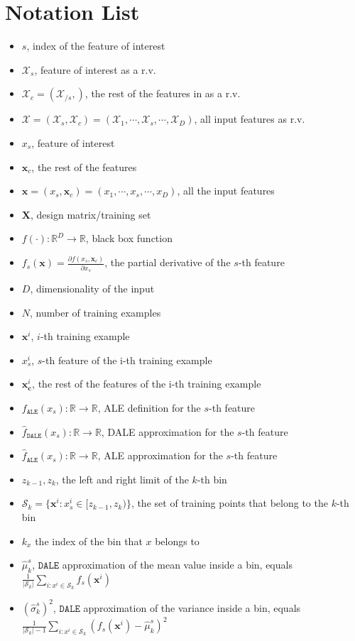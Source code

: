 \documentclass[wcp]{jmlr}
\newcommand{\xc}{\mathbf{x}_c}
\newcommand{\xci}{\mathbf{x}^i_{\mathbf{c}}}
\newcommand{\xb}{\mathbf{x}}
\newcommand{\R}{\mathbb{R}}
\begin{document}
\section{Notation List}
\label{sec:not-list}
%
\begin{itemize}
\item \( s \), index of the feature of interest
\item \( \mathcal{X}_s \), feature of interest as a r.v.
\item \( \mathcal{X}_c = (\mathcal{X}_{/s}, )\), the rest of the features in as a r.v.
\item \( \mathcal{X} = (\mathcal{X}_s, \mathcal{X}_c) = (\mathcal{X}_1, \cdots, \mathcal{X}_s, \cdots, \mathcal{X}_D) \), all input features as r.v.
\item \( x_s \), feature of interest
\item \( \xc \), the rest of the features
\item \( \xb = (x_s, \xc) = (x_1, \cdots, x_s, \cdots, x_D)\), all the input features
\item \( \mathbf{X} \), design matrix/training set
\item \( f(\cdot) : \R^D \rightarrow \R \), black box function
\item \( f_s(\xb) = \frac{\partial f(x_s, \xc)}{\partial x_s} \), the partial derivative of the \( s \)-th feature
\item \( D \), dimensionality of the input
\item \( N \), number of training examples
\item \( \xb^i \), \(i\)-th training example
\item \( x^i_s \), \(s\)-th feature of the i-th training example
\item \( \xci \), the rest of the features of the i-th training example
\item \( f_{\mathtt{ALE}}(x_s) : \R \rightarrow \R\), ALE definition for the \(s\)-th feature
\item \( \hat{f}_{\mathtt{DALE}}(x_s) : \R \rightarrow \R\), DALE approximation for the \(s\)-th feature
\item \( \hat{f}_{\mathtt{ALE}}(x_s) : \R \rightarrow \R\), ALE approximation for the \(s\)-th feature
\item \( z_{k-1}, z_k\), the left and right limit of the \( k\)-th bin
\item \( \mathcal{S}_k = \{ \xb^i : x^i_s \in [z_{k-1}, z_k) \}\), the set of training points that belong to the \( k\)-th bin
\item \( k_x \) the index of the bin that \( x \) belongs to
\item \( \hat{\mu}_k^s\), \(\mathtt{DALE}\) approximation of the mean value inside a bin, equals \( \frac{1}{|\mathcal{S}_k|} \sum_{i: x^i\in \mathcal{S}_k} f_s(\xb^i) \)
\item \( (\hat{\sigma}_k^s)^2\), \(\mathtt{DALE}\) approximation of the variance inside a bin, equals \( \frac{1}{|\mathcal{S}_k|-1} \sum_{i: x^i\in \mathcal{S}_k} (f_s(\xb^i) - \hat{\mu}_k^s)^2 \)

\end{itemize}
\end{document}

